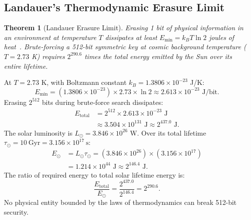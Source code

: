 \documentclass{ieeeaccess}
\newtheorem{theorem}{Theorem}
\newenvironment{proof}{\begin{IEEEproof}\IEEEQEDoff}{\end{IEEEproof}}
\begin{document}
\subsection{Landauer's Thermodynamic Erasure Limit}
\begin{theorem}[Landauer Erasure Limit]
\label{thm:L10-landauer}
Erasing 1 bit of physical information in an environment at temperature $T$ dissipates at least $E_{\min} = k_B T \ln 2$ joules of heat~\cite{Landauer1961}.
Brute-forcing a 512-bit symmetric key at cosmic background temperature ($T = 2.73$ K) requires $2^{290.6}$ times the total energy emitted by the Sun over its entire lifetime.
\end{theorem}
\begin{proof}
At $T = 2.73$ K, with Boltzmann constant $k_B = 1.3806 \times 10^{-23}$ J/K:
\begin{equation}
  E_{\min} = (1.3806 \times 10^{-23}) \times 2.73 \times \ln 2 \approx 2.613 \times 10^{-23} \text{ J/bit}.
\end{equation}
Erasing $2^{512}$ bits during brute-force search dissipates:
\begin{equation}
\begin{aligned}
  E_{\mathrm{total}} &= 2^{512} \times 2.613 \times 10^{-23} \text{ J} \\
  &\approx 3.504 \times 10^{131} \text{ J} \approx 2^{437.0} \text{ J}.
\end{aligned}
\end{equation}
The solar luminosity is $L_\odot = 3.846 \times 10^{26}$ W. Over its total lifetime $\tau_\odot = 10\ \text{Gyr} = 3.156 \times 10^{17}\ \text{s}$:
\begin{equation}
\begin{aligned}
  E_\odot &= L_\odot \tau_\odot = (3.846 \times 10^{26}) \times (3.156 \times 10^{17}) \\
  &= 1.214 \times 10^{44} \text{ J} \approx 2^{146.4} \text{ J}.
\end{aligned}
\end{equation}
The ratio of required energy to total solar lifetime energy is:
\begin{equation}
  \frac{E_{\mathrm{total}}}{E_\odot} = \frac{2^{437.0}}{2^{146.4}} = 2^{290.6}.
\end{equation}
No physical entity bounded by the laws of thermodynamics can break 512-bit security.
\end{proof}
\end{document}
